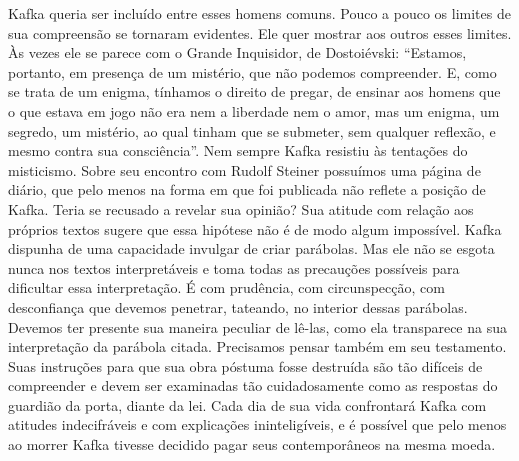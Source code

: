 Kafka queria ser incluído entre esses homens comuns. Pouco a pouco os
limites de sua compreensão se tornaram evidentes. Ele quer mostrar aos
outros esses limites. Às vezes ele se parece com o Grande Inquisidor, de
Dostoiévski: ``Estamos, portanto, em presença de um mistério, que não
podemos compreender. E, como se trata de um enigma, tínhamos o direito
de pregar, de ensinar aos homens que o que estava em jogo não era nem a
liberdade nem o amor, mas um enigma, um segredo, um mistério, ao qual
tinham que se submeter, sem qualquer reflexão, e mesmo contra sua
consciência''. Nem sempre Kafka resistiu às tentações do misticismo.
Sobre seu encontro com Rudolf Steiner possuímos uma página de diário,
que pelo menos na forma em que foi publicada não reflete a posição de
Kafka. Teria se recusado a revelar sua opinião? Sua atitude com relação
aos próprios textos sugere que essa hipótese não é de modo algum
impossível. Kafka dispunha de uma capacidade invulgar de criar
parábolas. Mas ele não se esgota nunca nos textos interpretáveis e toma
todas as precauções possíveis para dificultar essa interpretação. É com
prudência, com circunspecção, com desconfiança que devemos penetrar,
tateando, no interior dessas parábolas. Devemos ter presente sua maneira
peculiar de lê-las, como ela transparece na sua interpretação da
parábola citada. Precisamos pensar também em seu testamento. Suas
instruções para que sua obra póstuma fosse destruída são tão difíceis de
compreender e devem ser examinadas tão cuidadosamente como as respostas
do guardião da porta, diante da lei. Cada dia de sua vida confrontará
Kafka com atitudes indecifráveis e com explicações ininteligíveis, e é
possível que pelo menos ao morrer Kafka tivesse decidido pagar seus
contemporâneos na mesma moeda.

